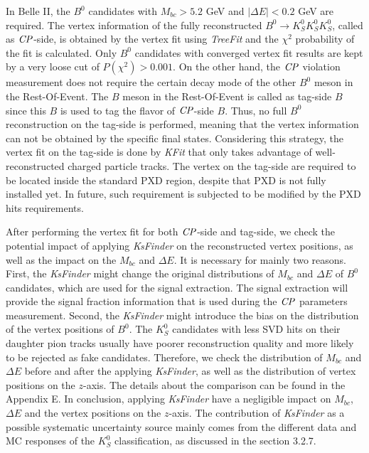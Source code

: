  In Belle II, the $B^0$ candidates with $M_{bc} > 5.2$ GeV and $|\Delta{E}| < 0.2$ GeV are required. The vertex information of the fully reconstructed $B^0 \to K_S^0  K_S^0  K_S^0$, called as $\it{CP}$-side, is obtained by the vertex fit using \textit{TreeFit} and the $\chi^2$ probability of the fit is calculated.  Only $B^0$ candidates with converged vertex fit results are kept by a very loose cut of  $P(\chi^2)> 0.001$. On the other hand, the $\it{CP}$ violation measurement does not require the certain decay mode of the other $B^0$ meson in the Rest-Of-Event. The $B$ meson in the Rest-Of-Event is called as tag-side $B$ since this $B$ is used to tag the flavor of $\it{CP}$-side $B$. Thus, no full $B^0$ reconstruction on the tag-side is performed, meaning that the vertex information can not be obtained by the specific final states. Considering this strategy, the vertex fit on the tag-side is done by \textit{KFit} that only takes advantage of well-reconstructed charged particle tracks. The vertex on the tag-side are required to be located inside the standard PXD region, despite that PXD is not fully installed yet. In future, such requirement is subjected to be modified by the PXD hits requirements. 
 
 After performing the vertex fit for both $\it{CP}$-side and tag-side, we check the potential impact of applying \textit{KsFinder} on the reconstructed vertex positions, as well as the impact on the $M_{bc}$ and $\Delta E$. It is necessary for mainly two reasons. First, the \textit{KsFinder} might change the original distributions of $M_{bc}$ and $\Delta E$ of $B^0$ candidates, which are used for the signal extraction. The signal extraction will provide the signal fraction information that is used during the $\it{CP}$ parameters measurement. Second, the \textit{KsFinder} might introduce the bias on the distribution of the vertex positions of $B^0$. The $K_S^0$ candidates with less SVD hits on their daughter pion tracks usually have poorer reconstruction quality and more likely to be rejected as fake candidates. Therefore, we check the distribution of $M_{bc}$ and $\Delta E$ before and after the applying \textit{KsFinder}, as well as the distribution of vertex positions on the $z$-axis. The details about the comparison can be found in the Appendix E. In conclusion, applying \textit{KsFinder} have a negligible impact on $M_{bc}$, $\Delta E$ and the vertex positions on the $z$-axis. The contribution of \textit{KsFinder} as a possible systematic uncertainty source mainly comes from the different data and MC responses of the $K_S^0$ classification, as discussed in the section 3.2.7. 
 
